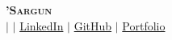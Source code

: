 \begin{center}
\textbf{\Huge \scshape {'Sargun} } \\ \vspace{3pt} %
\small
\faMobile \hspace{.5pt} \href{tel: {} }{ {} } %
$|$
\faAt \hspace{.5pt} \href{mailto: {} }{ {} } %
$|$
\faLinkedinSquare \hspace{.5pt} \href{ {} }{LinkedIn} %
$|$
\faGithub \hspace{.5pt} \href{ {} }{GitHub} %
$|$
\faGlobe \hspace{.5pt} \href{ {} }{Portfolio} %
\end{center}
